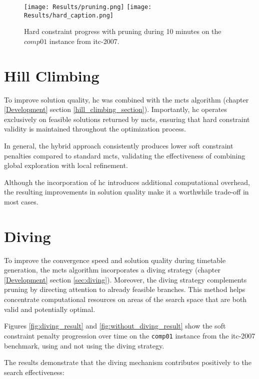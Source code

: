 \begin{figure}
 \centering
    \texttt{[image: Results/pruning.png]}
    \texttt{[image: Results/hard\_caption.png]}
    \caption{Hard constraint progress with pruning during 10 minutes on the \(comp01\) instance from \ac{itc-2007}.}
    \label{fig:pruning_result}
\end{figure}

\section{Hill Climbing}

To improve solution quality, \ac{hc} was combined with the \ac{mcts} algorithm (chapter \ref{Development} section \ref{hill_climbing_section}). Importantly, \ac{hc} operates exclusively on feasible solutions returned by \ac{mcts}, ensuring that hard constraint validity is maintained throughout the optimization process.

In general, the hybrid approach consistently produces lower soft constraint penalties compared to standard \ac{mcts}, validating the effectiveness of combining global exploration with local refinement. 

Although the incorporation of \ac{hc} introduces additional computational overhead, the resulting improvements in solution quality make it a worthwhile trade-off in most cases.
   
\section{Diving}

To improve the convergence speed and solution quality during timetable generation, the \ac{mcts} algorithm incorporates a diving strategy (chapter \ref{Development} section \ref{sec:diving}). Moreover, the diving strategy complements pruning by directing attention to already feasible branches. This method helps concentrate computational resources on areas of the search space that are both valid and potentially optimal.

Figures \ref{fig:diving_result} and \ref{fig:without_diving_result} show the soft constraint penalty progression over time on the \texttt{comp01} instance from the \ac{itc-2007} benchmark, using and not using the diving strategy.

The results demonstrate that the diving mechanism contributes positively to the search effectiveness:

